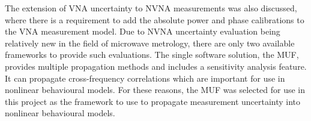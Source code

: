\documentclass[../thesis/thesis.tex]{subfiles}
\begin{document}
The extension of VNA uncertainty to NVNA measurements was also discussed, where there is a requirement to add the absolute power and phase calibrations to the VNA measurement model. Due to NVNA uncertainty evaluation being relatively new in the field of microwave metrology, there are only two available frameworks to provide such evaluations. The single software solution, the MUF, provides multiple propagation methods and includes a sensitivity analysis feature. It can propagate cross-frequency correlations which are important for use in nonlinear behavioural models. For these reasons, the MUF was selected for use in this project as the framework to use to propagate measurement uncertainty into nonlinear behavioural models.


\end{document}
